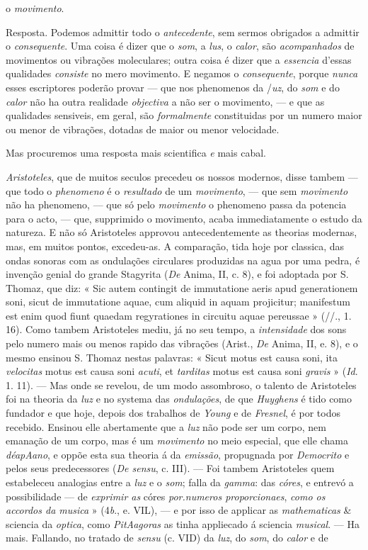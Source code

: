 o \emph{movimento}.\par Resposta. Podemos admittir todo o \emph{antecedente}, sem sermos obrigados a admittir o \emph{consequente}. Uma coisa é dizer que o \emph{som}, a \emph{lus}, o \emph{calor}, são \emph{acompanhados} de movimentos ou vibrações moleculares; outra coisa é dizer que a \emph{essencia} d'essas qualidades \emph{consiste} no mero movimento. E negamos o \emph{consequente}, porque \emph{nunca} esses escriptores poderão provar --- que nos phenomenos da /\emph{uz}, do \emph{som} e do \emph{calor} não ha outra realidade \emph{objectiva} a não ser o movimento, --- e que as qualidades sensiveis, em geral, são \emph{formalmente} constituidas por un numero maior ou menor de vibrações, dotadas de maior ou menor velocidade.\par Mas procuremos uma resposta mais scientifica \emph{e} mais cabal.\par \emph{Aristoteles}, que de muitos seculos precedeu os nossos modernos, disse tambem --- que todo o \emph{phenomeno} é o \emph{resultado} de um \emph{movimento}, --- que sem \emph{movimento} não ha phenomeno, --- que só pelo \emph{movimento} o phenomeno passa da potencia para o acto, --- que, supprimido o movimento, acaba immediatamente o estudo da natureza. E não só Aristoteles approvou antecedentemente as theorias modernas, mas, em muitos pontos, excedeu-as. A comparação, tida hoje por classica, das ondas sonoras com as ondulações circulares produzidas na agua por uma pedra, é invenção genial do grande Stagyrita (\emph{De} Anima, II, c. 8), e foi adoptada por S. Thomaz, que diz: « Sic autem contingit de immutatione aeris apud generationem soni, sicut de immutatione aquae, cum aliquid in aquam projicitur; manifestum est enim quod fiunt quaedam regyrationes in circuitu aquae pereussae » (//., 1. 16). Como tambem Aristoteles mediu, já no seu tempo, a \emph{intensidade} dos sons pelo numero mais ou menos rapido das vibrações (Arist., \emph{De} Anima, II, e. 8), e o mesmo ensinou S. Thomaz nestas palavras: « Sicut motus est causa soni, ita \emph{velocitas} motus est causa soni \emph{acuti}, et \emph{tarditas} motus est causa soni \emph{gravis} » (\emph{Id}. 1. 11). --- Mas onde se revelou, de um modo assombroso, o talento de Aristoteles foi na theoria da \emph{luz} e no systema das \emph{ondulações}, de que \emph{Huyghens} é tido como fundador e que hoje, depois dos trabalhos de \emph{Young} e de \emph{Fresnel}, é por todos recebido. Ensinou elle abertamente que a \emph{luz} não pode ser um corpo, nem emanação de um corpo, mas é um \emph{movimento} no meio especial, que elle chama \emph{déapAano}, e oppõe esta sua theoria á da \emph{emissão}, propugnada por \emph{Democrito} e pelos seus predecessores (\emph{De sensu}, c. III). --- Foi tambem Aristoteles quem estabeleceu analogias entre a \emph{luz} e o \emph{som}; falla da \emph{gamma}: das \emph{córes}, e entrevó a possibilidade --- de \emph{exprimir as} córes \emph{por.numeros proporcionaes}, \emph{como os accordos da musica} » (4\emph{b}., e. VIL), --- e por isso de applicar as \emph{mathematicas} \& sciencia da \emph{optica}, como \emph{PitAagoras} as tinha appliecado á sciencia \emph{musical}. --- Ha mais. Fallando, no tratado de \emph{sensu} (c. VID) da \emph{luz}, do \emph{som}, do \emph{calor} e de 